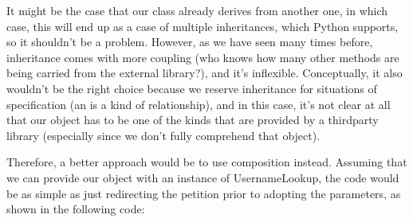 \documentclass[a4paper,10pt,english]{sphinxmanual}
\begin{document}
\begin{sphinxVerbatim}[commandchars=\\\{\}]
   


 
       
           
         

      
         
\end{sphinxVerbatim}

It might be the case that our class already derives from another one, in which case, this will
end up as a case of multiple inheritances, which Python supports, so it shouldn’t be a
problem. However, as we have seen many times before, inheritance comes with more
coupling (who knows how many other methods are being carried from the external
library?), and it’s inflexible. Conceptually, it also wouldn’t be the right choice because we
reserve inheritance for situations of specification (an is a kind of relationship), and in this
case, it’s not clear at all that our object has to be one of the kinds that are provided by a
third\sphinxhyphen{}party library (especially since we don’t fully comprehend that object).

Therefore, a better approach would be to use composition instead. Assuming that we can
provide our object with an instance of UsernameLookup, the code would be as simple as
just redirecting the petition prior to adopting the parameters, as shown in the following
code:

\begin{sphinxVerbatim}[commandchars=\\\{\}]
 
       
           
         
\end{sphinxVerbatim}
\end{document}
